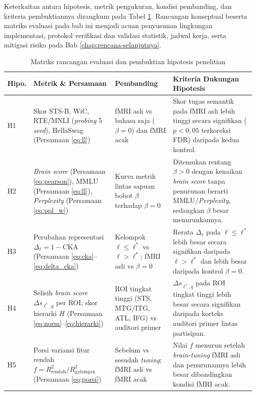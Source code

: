Keterkaitan antara hipotesis, metrik pengukuran, kondisi pembanding, dan kriteria pembuktiannya dirangkum pada Tabel \ref{tab:ds_matriks_hipotesis}. Rancangan konseptual beserta matriks evaluasi pada bab ini menjadi acuan penyusunan lingkungan implementasi, protokol verifikasi dan validasi statistik, jadwal kerja, serta mitigasi risiko pada Bab \ref{chap:rencana-selanjutnya}.

\begin{table}[h]
  \centering
  \caption{Matriks rancangan evaluasi dan pembuktian hipotesis penelitian}
  \label{tab:ds_matriks_hipotesis}
  \small
  \begin{tabularx}{\textwidth}{p{1.2cm} | p{3.6cm} | p{3.3cm} | X}
    \hline
    \textbf{Hipo.} & \textbf{Metrik \& Persamaan} & \textbf{Pembanding} & \textbf{Kriteria Dukungan Hipotesis} \\
    \hline
    H1 & Skor STS-B, WiC, RTE/MNLI (\textit{probing} 5 \textit{seed}), HellaSwag (Persamaan \ref{eq:ll}) & fMRI asli vs bahasa saja ($\beta=0$) dan fMRI acak & Skor tugas semantik pada fMRI asli lebih tinggi secara signifikan ($p < 0{,}05$ terkoreksi FDR) daripada kedua kontrol. \\
    \hline
    H2 & \textit{Brain score} (Persamaan \ref{eq:pearson}), MMLU (Persamaan \ref{eq:ll}), \textit{Perplexity} (Persamaan \ref{eq:ppl_w}) & Kurva metrik lintas sapuan bobot $\beta$ terhadap $\beta=0$ & Ditemukan rentang $\beta > 0$ dengan kenaikan \textit{brain score} tanpa penurunan berarti MMLU/\textit{Perplexity}, sedangkan $\beta$ besar menurunkannya. \\
    \hline
    H3 & Perubahan representasi $\Delta_\ell = 1 - \mathrm{CKA}$ (Persamaan \ref{eq:cka}--\ref{eq:delta_cka}) & Kelompok $\ell \le \ell^*$ vs $\ell > \ell^*$; fMRI asli vs $\beta=0$ & Rerata $\Delta_\ell$ pada $\ell \le \ell^*$ lebih besar secara signifikan daripada $\ell > \ell^*$ dan lebih besar daripada kontrol $\beta=0$. \\
    \hline
    H4 & Selisih \textit{brain score} $\Delta s_{\ell^*, q}$ per ROI; skor hierarki $H$ (Persamaan \ref{eq:norm}--\ref{eq:hierarki}) & ROI tingkat tinggi (STS, MTG/ITG, ATL, IFG) vs auditori primer & $\Delta s_{\ell^*, q}$ pada ROI tingkat tinggi lebih besar secara signifikan daripada korteks auditori primer lintas partisipan. \\
    \hline
    H5 & Porsi variansi fitur rendah $f = R^2_{\text{rendah}} / R^2_{\text{gabungan}}$ (Persamaan \ref{eq:porsi}) & Sebelum vs sesudah \textit{tuning}; fMRI asli vs fMRI acak & Nilai $f$ menurun setelah \textit{brain-tuning} fMRI asli dan penurunannya lebih besar dibandingkan kondisi fMRI acak. \\
    \hline
  \end{tabularx}
\end{table}